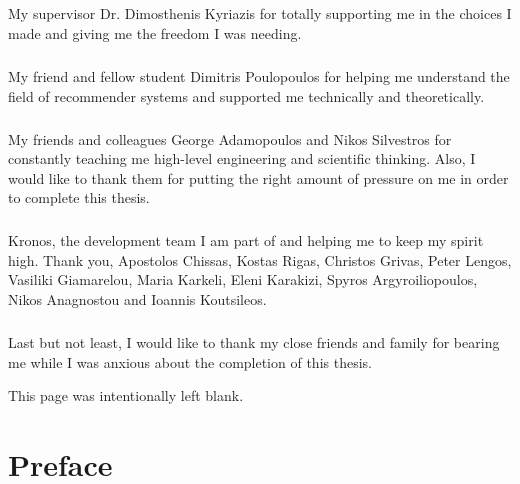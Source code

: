 \documentclass[12pt, a4paper, oneside, greek]{report}
\begin{document}
\paragraph{} My supervisor Dr. Dimosthenis Kyriazis for totally supporting me in the choices I made and giving me the freedom I was needing.

\paragraph{} My friend and fellow student Dimitris Poulopoulos for helping me understand the field of recommender systems and supported me technically and theoretically.

\paragraph{} My friends and colleagues George Adamopoulos and Nikos Silvestros for constantly teaching me high-level engineering and scientific thinking. Also, I would like to thank them for putting the right amount of pressure on me in order to complete this thesis.

\paragraph{} Kronos, the development team I am part of and helping me to keep my spirit high. Thank you, Apostolos Chissas, Kostas Rigas, Christos Grivas, Peter Lengos, Vasiliki Giamarelou, Maria Karkeli, Eleni Karakizi, Spyros Argyroiliopoulos, Nikos Anagnostou and Ioannis Koutsileos. 

\paragraph{} Last but not least, I would like to thank my close friends and family for bearing me while I was anxious about the completion of this thesis.

\newpage
\begin{center}
	This page was intentionally left blank.
\end{center}
\newpage
\chapter*{Preface}
\end{document}
